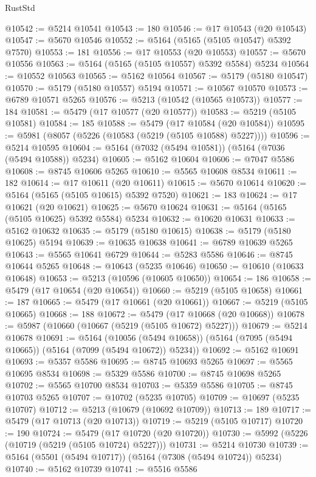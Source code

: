 \begin{lexlean}{RustStd}
\begin{coremodule}
@10542 := @5214 @10541
@10543 := 180
@10546 := @17 @10543 (@20 @10543)
@10547 := @5670 @10546
@10552 := @5164 (@5165 (@5105 @10547) @5392 @7570)
@10553 := 181
@10556 := @17 @10553 (@20 @10553)
@10557 := @5670 @10556
@10563 := @5164 (@5165 (@5105 @10557) @5392 @5584) @5234
@10564 := @10552 @10563
@10565 := @5162 @10564
@10567 := @5179 (@5180 @10547)
@10570 := @5179 (@5180 @10557) @5194
@10571 := @10567 @10570
@10573 := @6789 @10571 @5265
@10576 := @5213 (@10542 (@10565 @10573))
@10577 := 184
@10581 := @5479 (@17 @10577 (@20 @10577))
@10583 := @5219 (@5105 @10581)
@10584 := 185
@10588 := @5479 (@17 @10584 (@20 @10584))
@10595 := @5981 (@8057 (@5226 (@10583 (@5219 (@5105 @10588) @5227))))
@10596 := @5214 @10595
@10604 := @5164 (@7032 (@5494 @10581)) (@5164 (@7036 (@5494 @10588)) @5234)
@10605 := @5162 @10604
@10606 := @7047 @5586
@10608 := @8745 @10606 @5265
@10610 := @5565 @10608 @8534
@10611 := 182
@10614 := @17 @10611 (@20 @10611)
@10615 := @5670 @10614
@10620 := @5164 (@5165 (@5105 @10615) @5392 @7520)
@10621 := 183
@10624 := @17 @10621 (@20 @10621)
@10625 := @5670 @10624
@10631 := @5164 (@5165 (@5105 @10625) @5392 @5584) @5234
@10632 := @10620 @10631
@10633 := @5162 @10632
@10635 := @5179 (@5180 @10615)
@10638 := @5179 (@5180 @10625) @5194
@10639 := @10635 @10638
@10641 := @6789 @10639 @5265
@10643 := @5565 @10641 @6729
@10644 := @5283 @5586
@10646 := @8745 @10644 @5265
@10648 := @10643 (@5235 @10646)
@10650 := @10610 (@10633 @10648)
@10653 := @5213 (@10596 (@10605 @10650))
@10654 := 186
@10658 := @5479 (@17 @10654 (@20 @10654))
@10660 := @5219 (@5105 @10658)
@10661 := 187
@10665 := @5479 (@17 @10661 (@20 @10661))
@10667 := @5219 (@5105 @10665)
@10668 := 188
@10672 := @5479 (@17 @10668 (@20 @10668))
@10678 := @5987 (@10660 (@10667 (@5219 (@5105 @10672) @5227)))
@10679 := @5214 @10678
@10691 := @5164
    (@10056 (@5494 @10658))
    (@5164 (@7095 (@5494 @10665)) (@5164 (@7099 (@5494 @10672)) @5234))
@10692 := @5162 @10691
@10693 := @5357 @5586
@10695 := @8745 @10693 @5265
@10697 := @5565 @10695 @8534
@10698 := @5329 @5586
@10700 := @8745 @10698 @5265
@10702 := @5565 @10700 @8534
@10703 := @5359 @5586
@10705 := @8745 @10703 @5265
@10707 := @10702 (@5235 @10705)
@10709 := @10697 (@5235 @10707)
@10712 := @5213 (@10679 (@10692 @10709))
@10713 := 189
@10717 := @5479 (@17 @10713 (@20 @10713))
@10719 := @5219 (@5105 @10717)
@10720 := 190
@10724 := @5479 (@17 @10720 (@20 @10720))
@10730 := @5992 (@5226 (@10719 (@5219 (@5105 @10724) @5227)))
@10731 := @5214 @10730
@10739 := @5164 (@5501 (@5494 @10717)) (@5164 (@7308 (@5494 @10724)) @5234)
@10740 := @5162 @10739
@10741 := @5516 @5586

\end{coremodule}
\end{lexlean}
